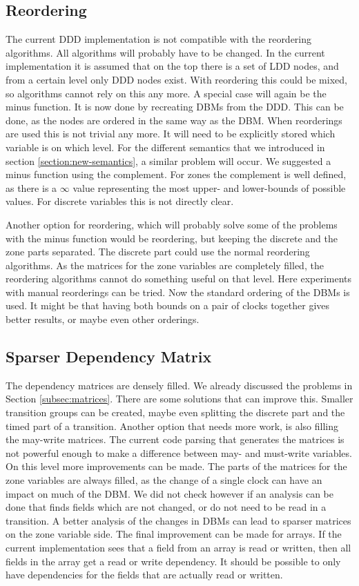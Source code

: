 \subsection{Reordering}
The current DDD implementation is not compatible with the reordering algorithms. All algorithms will probably have to be changed. In the current implementation it is assumed that on the top there is a set of LDD nodes, and from a certain level only DDD nodes exist. With reordering this could be mixed, so algorithms cannot rely on this any more. A special case will again be the minus function. It is now done by recreating DBMs from the DDD. This can be done, as the nodes are ordered in the same way as the DBM. When reorderings are used this is not trivial any more. It will need to be explicitly stored which variable is on which level. For the different semantics that we introduced in section \ref{section:new-semantics}, a similar problem will occur. We suggested a minus function using the complement. For zones the complement is well defined, as there is a $\infty$ value representing the most upper- and lower-bounds of possible values. For discrete variables this is not directly clear.
 
Another option for reordering, which will probably solve some of the problems with the minus function would be reordering, but keeping the discrete and the zone parts separated. The discrete part could use the normal reordering algorithms. As the matrices for the zone variables are completely filled, the reordering algorithms cannot do something useful on that level. Here experiments with manual reorderings can be tried. Now the standard ordering of the DBMs is used. It might be that having both bounds on a pair of clocks together gives better results, or maybe even other orderings.

\subsection{Sparser Dependency Matrix}
The dependency matrices are densely filled. We already discussed the problems in Section \ref{subsec:matrices}. There are some solutions that can improve this. Smaller transition groups can be created, maybe even splitting the discrete part and the timed part of a transition. Another option that needs more work, is also filling the may-write matrices. The current code parsing that generates the matrices is not powerful enough to make a difference between may- and must-write variables. On this level more improvements can be made. The parts of the matrices for the zone variables are always filled, as the change of a single clock can have an impact on much of the DBM. We did not check however if an analysis can be done that finds fields which are not changed, or do not need to be read in a transition. A better analysis of the changes in DBMs can lead to sparser matrices on the zone variable side. The final improvement can be made for arrays. If the current implementation sees that a field from an array is read or written, then all fields in the array get a read or write dependency. It should be possible to only have dependencies for the fields that are actually read or written.

